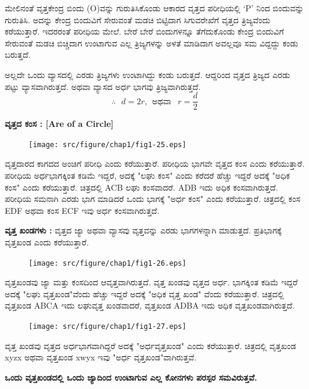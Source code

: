 \begin{enumerate}
 
 ಮೇಲಿನಂತೆ ವೃತ್ತಕೇಂದ್ರ ಬಿಂದು (O)ವನ್ನು ಗುರುತಿಸಿಕೊಂಡು ಆಕಾರದ ವೃತ್ತದ ಪರೀಧಿಯಲ್ಲಿ `P' ನಿಂದ ಬಿಂದುವನ್ನು ಗುರುತಿಸಿ. ಅದನ್ನು ಕೇಂದ್ರ ಬಿಂದುವಿಗೆ ಸೇರುವಂತೆ ಮಡಚಿ ಬಿಟ್ಟಿದಾಗ ಸಿಗುವರೇಖೆಗೆ ವೃತ್ತದ ತ್ರಿಜ್ಯವೆಂದು ಕರೆಯುತ್ತಾರೆ. ಇದರರಂತೆ ಪರೀಧಿಯ ಮೇಲೆ.
  ಬೇರೆ ಬೇರೆ ಬಿಂದುಗಳನ್ನೂ ತೆಗೆದುಕೊಂಡು ಕೇಂದ್ರ ಬಿಂದುವಿಗೆ ಸೇರುವಂತೆ ಮಡಚಿ ಬಿಚ್ಚಿದಾಗ ಉಂಟಾಗುವ ಎಲ್ಲ ತ್ರಿಜ್ಯಗಳನ್ನು ಅಳತೆ ಮಾಡಿದಾಗ ಅವಲ್ಲವೂ ಸಮ ವಿದ್ದದ್ದು ಕಂಡು ಬರುತ್ತದೆ. 
  
  ಅಲ್ಲದೇ ಒಂದು ವ್ಯಾಸದಲ್ಲಿ ಎರಡು ತ್ರಿಜ್ಯಗಳು ಉಂಟಾಗಿದ್ದು ಕಂಡು ಬರುತ್ತದೆ. ಆದ್ದರಿಂದ ವೃತ್ತದ ತ್ರಿಜ್ಯದ ಎರಡು ಪಟ್ಟು ವ್ಯಾಸವಾಗಿರುತ್ತದೆ. ಅಥವಾ ವ್ಯಾಸದ ಅರ್ಧ ಭಾಗವು ತ್ರಿಜ್ಯವಾಗಿರುತ್ತದೆ. 
  $$
  \therefore~~~ d = 2 r ,~~ \text{ಅಥವಾ } ~~r = \dfrac{d}{2}
  $$
    \end{enumerate}

\noindent
\textbf{ವೃತ್ತದ ಕಂಸ : [Are of a Circle]}
\begin{figure}[H]
\centering
\texttt{[image: src/figure/chap1/fig1-25.eps]}
\end{figure}
 
 ವೃತ್ತದಾರದ ಕಾಗದದ ಅಂಚಿಗೆ ಪರೀಧಿ ಎಂದು ಕರೆಯುತ್ತಾರೆ. ಪರೀಧಿಯ ಭಾಗವೇ ವೃತ್ತದ ಕಂಸ ಎಂದು ಕರೆಯುತ್ತಾರೆ. ಪರೀಧಿಯ ಅರ್ಧಭಾಗಕ್ಕಿಂತ ಕಡಿಮೆ ಇದ್ದರೆ, ಅದಕ್ಕೆ "ಲಘು ಕಂಸ" ಎಂದು ಕರೆದರೆ ಹೆಚ್ಚು ಇದ್ದರೆ ಅದಕ್ಕೆ "ಅಧಿಕ ಕಂಸ" ಎಂದು ಕರೆಯುತ್ತಾರೆ. ಚಿತ್ರದಲ್ಲಿ ACB ಲಘು ಕಂಸವಾದರೆ. ADB ಇದು ಅಧಿಕ ಕಂಸವಾಗಿರುತ್ತದೆ. ಪರೀಧಿಯ ಸಮನಾಗಿ ಎರಡು ಭಾಗ ಮಾಡಿದರೆ ಒಂದು ಭಾಗಕ್ಕೆ "ಅರ್ಧ ಕಂಸ" ಎಂದು ಕರೆಯುತ್ತಾರೆ. ಚಿತ್ರದಲ್ಲಿ ಕಂಸ  EDF ಅಥವಾ ಕಂಸ  ECF ಇವು ಅರ್ಧ ಕಂಸವಾಗಿರುತ್ತದೆ. 
 
 
 \noindent
   \textbf{ವೃತ್ತ ಖಂಡಗಳು :} ವೃತ್ತದ ಜ್ಯಾ ಅಥವಾ ವ್ಯಾಸವು ವೃತ್ತವನ್ನು ಎರಡು ಭಾಗಗಳನ್ನಾಗಿ ಮಾಡುತ್ತದೆ. ಪ್ರತಿಭಾಗಕ್ಕೆ ವೃತ್ತಖಂಡ ಎಂದು ಕರೆಯುತ್ತಾರೆ. 
  \begin{figure}[H]
\centering
\texttt{[image: src/figure/chap1/fig1-26.eps]}
\end{figure}
 
  ವೃತ್ತಖಂಡವು ಜ್ಯಾ ಮತ್ತು ಕಂಸದಿಂದ ಆವೃತ್ತವಾಗಿರುತ್ತದೆ. ವೃತ್ತ ಖಂಡವು ವೃತ್ತದ ಅರ್ಧ. ಭಾಗಕ್ಕಿಂತ ಕಡಿಮೆ ಇದ್ದರೆ ಅದಕ್ಕೆ "ಲಘು ವೃತ್ತಖಂಡ"ವೆಂದು ಹೆಚ್ಚು ಇದ್ದರೆ ಅದಕ್ಕೆ "ಅಧಿಕ ವೃತ್ತ ಖಂಡ" ವೆಂದು ಕರೆಯುತ್ತಾರೆ. ಚಿತ್ರದಲ್ಲಿ ವೃತ್ತಖಂಡ ABCA ಇದು ಲಘುವೃತ್ತ ಖಂಡವಾದರೆ, ವೃತ್ತಖಂಡ ADBA ಇದು ಅಧಿಕ ವೃತ್ತಖಂಡವಾಗಿರುತ್ತದೆ. 
 \begin{figure}[H]
\centering
\texttt{[image: src/figure/chap1/fig1-27.eps]}
\end{figure}

 ವೃತ್ತ ಖಂಡವು ವೃತ್ತದ ಅರ್ಧಭಾಗವಾಗಿದ್ದರೆ ಅದಕ್ಕೆ "ಅರ್ಧವೃತ್ತಖಂಡ" ಎಂದು ಕರೆಯುತ್ತಾರೆ. ಚಿತ್ರದಲ್ಲಿ ವೃತ್ತಖಂಡ xyzx ಅಥವಾ ವೃತ್ತಖಂಡ xwyx ಇವು "ಅರ್ಧ ವೃತ್ತಖಂಡ"ವಾಗಿರುತ್ತವೆ. 
 
 \smallskip
 \noindent
 \textbf{ಒಂದು ವೃತ್ತಖಂಡದಲ್ಲಿ ಒಂದು ಜ್ಯಾದಿಂದ ಉಂಟಾಗುವ ಎಲ್ಲ ಕೋನಗಳು ಪರಸ್ಪರ ಸಮ\break ವಿರುತ್ತವೆ.}
 
